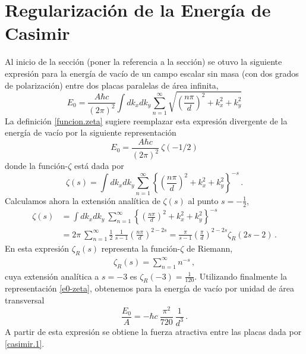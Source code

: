 \section{Regularización de la Energía de Casimir}

Al inicio de la sección {\red (poner la referencia a la sección)} se otuvo la siguiente expresión para la energía de vacío de un campo escalar sin masa (con dos grados de polarización) entre dos placas paralelas de área infinita,
\begin{equation}
E _0 = \frac{A \hbar c}{(2 \pi) ^2} \int dk _x dk _y 
\sum _{n=1} ^{\infty} 
\sqrt{
		\left( \frac{n \pi}{d} \right) ^2 + k _x ^2 + k _y ^2
		}
\end{equation}
La definición \eqref{funcion.zeta} sugiere reemplazar esta expresión divergente de la energía de vacío por la siguiente representación
\begin{equation}\label{e0-zeta}
E _0 = \frac{A \hbar c}{(2 \pi) ^2} 
\ \zeta (-1/2)
\end{equation}
donde la función-$\zeta$ está dada por
\begin{equation}
\zeta(s) = \int dk _x dk _y 
\sum _{n=1} ^{\infty} 
\left\{\left( \frac{n \pi}{d} \right) ^2 + k _x ^2 + k _y ^2\right\}^{-s}\,.
\end{equation}
Calculamos ahora la extensión analítica de $\zeta(s)$ al punto $s=-\frac12$,
\begin{align}
\zeta (s) &= 
\int dk _x dk _y 
\ \sum _{n=1} ^{\infty} 
\left\{	\left( \frac{n \pi}{d} \right) ^2 + k _x ^2 + k _y ^2
		\right\}^{-s} \nonumber\\[2mm]
&=2\pi\ \sum _{n=1} ^{\infty}  \frac12\,\frac{1}{s-1} \left( \frac{n \pi}{d} \right) ^{2-2s} =
\frac{\pi}{s-1} \left( \frac{\pi}{d} \right) ^{2-2s} \zeta_R (2s-2)\,.
\end{align}
En esta expresión $\zeta_R(s)$ representa la función-$\zeta$ de Riemann,
\begin{align}
	\zeta_R(s)=\sum_{n=1}^\infty n^{-s}\,,
\end{align}
cuya extensión analítica a $s=-3$ es $\zeta_R(-3)=\frac{1}{120}$. Utilizando finalmente la representación \eqref{e0-zeta}, obtenemos para la energía de vacío por unidad de área transversal
\begin{equation}
\frac{E _0}{A} = 
- \hbar c\ \frac{ \pi ^2}{720}\ \frac{1}{d^3}\,.
\end{equation}
A partir de esta expresión se obtiene la fuerza atractiva entre las placas dada por \eqref{casimir.1}.

